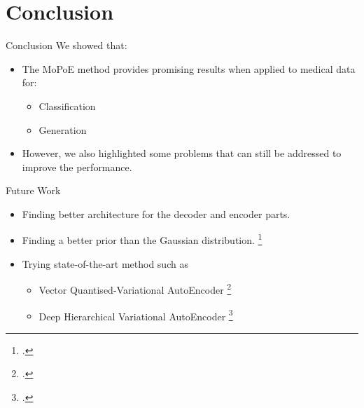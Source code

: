 \documentclass[aspectratio=169]{beamer}
\begin{document}
    \section{Conclusion}
    \begin{frame}{Conclusion}
        We showed that:
        \begin{itemize}
            \item The MoPoE method provides promising results when applied to medical data for:
            \begin{itemize}
                \item Classification
                \item Generation
            \end{itemize}
            \item However, we also highlighted some problems that can still be addressed to improve the performance.
        \end{itemize}
    \end{frame}

    \begin{frame}{Future Work}
        \begin{itemize}
            \item Finding better architecture for the decoder and encoder parts.
            \item Finding a better prior than the Gaussian distribution. \footcite{zhao2017towards}
            \item Trying state-of-the-art method such as
            \begin{itemize}
                \item Vector Quantised-Variational AutoEncoder \footcite{oord2018neural}
                \item Deep Hierarchical Variational AutoEncoder \footcite{vahdat2021nvae}
            \end{itemize}

        \end{itemize}

    \end{frame}

    \printbibliography
\end{document}
